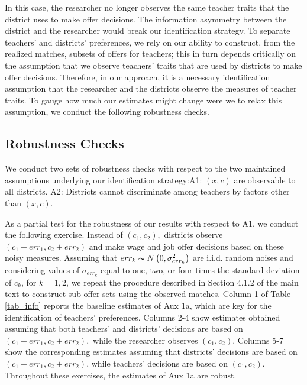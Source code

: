 \documentclass[notitlepage,12pt]{article}%
\begin{document}
In this case, the researcher no longer observes the same teacher traits that
the district uses to make offer decisions. The information asymmetry between
the district and the researcher would break our identification strategy. To
separate teachers' and districts' preferences, we rely on our ability to
construct, from the realized matches, subsets of offers for teachers; this in
turn depends critically on the assumption that we observe teachers' traits
that are used by districts to make offer decisions. Therefore, in our approach, it is a necessary identification assumption that the researcher and the districts observe the measures of teacher traits. To gauge
how much our estimates might change were we to relax this assumption, we conduct the following robustness checks.

\subsection{Robustness Checks}

We conduct two sets of robustness checks with respect to the two maintained
assumptions underlying our identification strategy:\newline A1: $\left(
x,c\right)  $ are observable to all districts. \newline A2: Districts cannot
discriminate among teachers by factors other than $\left(  x,c\right)  $.

As a partial test for the robustness of our results with respect to A1, we
conduct the following exercise. Instead of $\left(  c_{1},c_{2}\right)  ,$
districts observe $\left(  c_{1}+err_{1},c_{2}+err_{2}\right)  $ and make wage
and job offer decisions based on these noisy measures. Assuming that
$err_{k}\thicksim N\left(  0,\sigma_{err_{k}}^{2}\right)  $ are i.i.d. random
noises and considering values of $\sigma_{err_{k}}$ equal to one, two, or four
times the standard deviation of $c_{k}$, for $k=1,2$, we repeat the procedure
described in Section 4.1.2 of the main text to construct sub-offer sets using
the observed matches. Column 1 of Table \ref{tab_info} reports the baseline
estimates of Aux 1a, which are key for the identification of teachers'
preferences. Columns 2-4 show estimates obtained assuming that both teachers'
and districts' decisions are based on $\left(  c_{1}+err_{1},c_{2}%
+err_{2}\right)  ,$ while the researcher observes $\left(  c_{1},c_{2}\right)
$. Columns 5-7 show the corresponding estimates assuming that districts'
decisions are based on $\left(  c_{1}+err_{1},c_{2}+err_{2}\right)  $, while
teachers' decisions are based on $\left(  c_{1},c_{2}\right)  $. Throughout
these exercises, the estimates of Aux 1a are robust.
\end{document}
